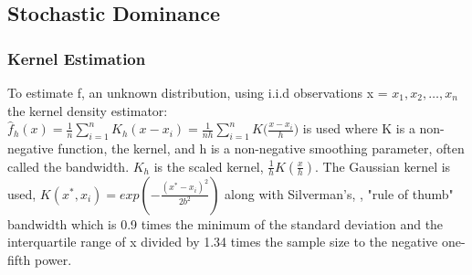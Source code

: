 \subsection{Stochastic Dominance}
\subsubsection{Kernel Estimation}
To estimate f, an unknown distribution, using i.i.d observations x = {$x_{1}, x_{2}, \dots, x_{n}$} the kernel density estimator:\\
$\widehat{f}_{h}(x)={\frac{1}{n}}\sum_{i=1}^{n}K_{h}(x-x_{i})={\frac{1}{nh}}\sum_{i=1}^{n}K{\Big(}{\frac{x-x_{i}}{h}}{\Big)}$
is used where K is a non-negative function, the kernel, and h is a non-negative smoothing parameter, often called the bandwidth. $K_{h}$ is the scaled kernel, $\frac{1}{h}K(\frac{x}{h})$. The Gaussian kernel is used, 
$K(x^{*},x_{i})= exp\left(-{\frac  {(x^{*}-x_{i})^{2}}{2b^{2}}}\right)$
along with Silverman's, \citet{silverman2018density}, "rule of thumb" bandwidth which is 0.9 times the minimum of the standard deviation and the interquartile range of x divided by 1.34 times the sample size to the negative one-fifth power.

\begin{figure}[htb]
	\centering
	\caption{{\bf These figures show the smoothed kernel density PDF estimates and empirical CDFs calculated for the returns to the unconstrained AV and SV managed US equity portfolios. The CDF functions are shown to illuminate the stochastic dominance tests which follow. See section \ref{sec:stoc_dom}}} \label{fig:kd_graph}
	\begin{subfigure}{\textwidth}
		
	\end{subfigure}
	
	\begin{subfigure}{\textwidth}
		
	\end{subfigure}
	
	\begin{subfigure}{\textwidth}
		
	\end{subfigure}
	
	\begin{subfigure}{\textwidth}
		
	\end{subfigure}
\end{figure}

